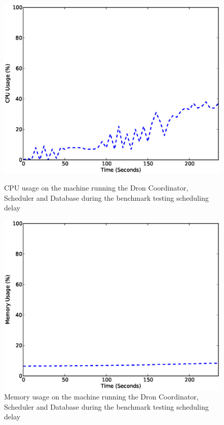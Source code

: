 \documentclass[11pt,a4paper,twoside]{report}
\begin{document}
\begin{figure}[ht]
\begin{minipage}[b]{0.5\linewidth}
\centering
\includegraphics[scale=0.35]{latency-one-cpu}
\caption{CPU usage on the machine running the Dron Coordinator, Scheduler and Database during the benchmark testing scheduling delay}
\label{fig:LatencyOneCpu}
\end{minipage}
\hspace{0.1cm}
\begin{minipage}[b]{0.48\linewidth}
\centering
\includegraphics[scale=0.35]{latency-one-mem}
\caption{Memory usage on the machine running the Dron Coordinator, Scheduler and Database during the benchmark testing scheduling delay}
\label{fig:LatencyOneMem}
\end{minipage}
\end{figure}
\end{document}
